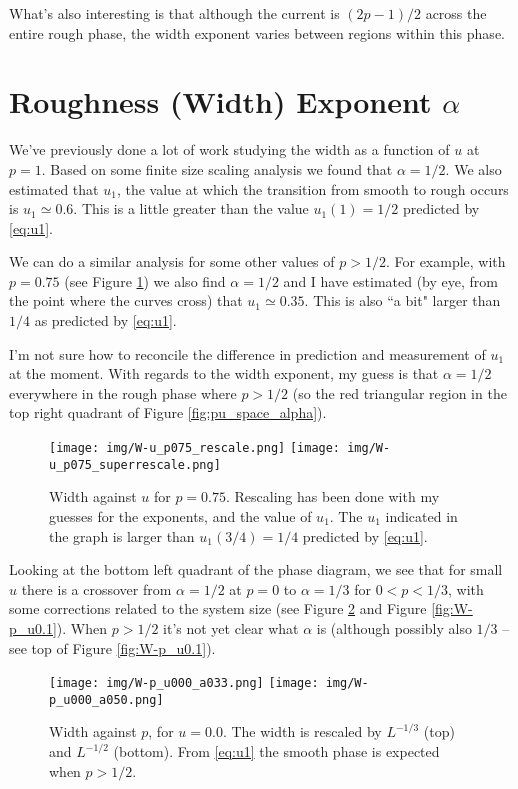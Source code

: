 \documentclass[a4paper,10pt]{article}
\newcommand{\fref}[1]{Figure \ref{#1}}
\begin{document}
What's also interesting is that although the current is $(2p-1)/2$ across the entire rough phase, the width exponent varies between regions within this phase.

\newpage
\section{Roughness (Width) Exponent $\alpha$}

We've previously done a lot of work studying the width as a function of $u$ at $p=1$. Based on some finite size scaling analysis we found that $\alpha=1/2$. We also estimated that $u_1$, the value at which the transition from smooth to rough occurs is $u_1\simeq0.6$. This is a little greater than the value $u_1(1)=1/2$ predicted by \eqref{eq:u1}.

We can do a similar analysis for some other values of $p>1/2$. For example, with $p=0.75$ (see \fref{fig:W-u_p0.75}) we also find $\alpha = 1/2$ and I have estimated (by eye, from the point where the curves cross) that $u_1 \simeq 0.35$. This is also ``a bit" larger than $1/4$ as predicted by \eqref{eq:u1}.

I'm not sure how to reconcile the difference in prediction and measurement of $u_1$ at the moment. With regards to the width exponent, my guess is that $\alpha=1/2$ everywhere in the rough phase where $p>1/2$ (so the red triangular region in the top right quadrant of  \fref{fig:pu_space_alpha}).

\begin{figure}
 \centering
 \texttt{[image: img/W-u\_p075\_rescale.png]}
 \texttt{[image: img/W-u\_p075\_superrescale.png]}
 \caption{Width against $u$ for $p = 0.75$. Rescaling has been done with my guesses for the exponents, and the value of $u_1$. The $u_1$ indicated in the graph is larger than $u_1(3/4)=1/4$ predicted by \eqref{eq:u1}. }
 \label{fig:W-u_p0.75}
\end{figure}

Looking at the bottom left quadrant of the phase diagram, we see that for small $u$ there is a crossover from $\alpha=1/2$ at $p=0$ to $\alpha=1/3$ for $0<p<1/3$, with some corrections related to the system size (see \fref{fig:W-p_u0.0} and \fref{fig:W-p_u0.1}). When $p > 1/2$ it's not yet clear what $\alpha$ is (although possibly also $1/3$ -- see top of \fref{fig:W-p_u0.1}).

\begin{figure}
 \centering
 \texttt{[image: img/W-p\_u000\_a033.png]}
 \texttt{[image: img/W-p\_u000\_a050.png]}
 \caption{Width against $p$, for $u=0.0$. The width is rescaled by $L^{-1/3}$ (top) and $L^{-1/2}$ (bottom). From \eqref{eq:u1} the smooth phase is expected when $p>1/2$.}
 \label{fig:W-p_u0.0}
\end{figure}
\end{document}
